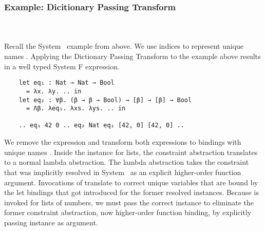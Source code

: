 \subsubsection{Example: Dicitionary Passing Transform}\hfill\\\\
Recall the System \Fo\ example from above. 
We use indices to represent unique names .
Applying the Dictionary Passing Transform to the example above results in a well typed System F expression.
\begin{verbatim}
    let eq₁ : Nat → Nat → Bool 
      = λx. λy. .. in
    let eq₂ : ∀β. (β → β → Bool) → [β] → [β] → Bool 
      = Λβ. λeq₁. λxs. λys. .. in
    
    .. eq₁ 42 0 .. eq₂ Nat eq₁ [42, 0] [42, 0] .. 
\end{verbatim}
We remove the \inl{|\Decl|}expression and transform both \inl{|\Inst|}expressions to  bindings with unique names . 
Inside the instance for lists, the constraint abstraction translates to a normal lambda abstraction. 
The lambda abstraction takes the constraint that was implicitly resolved in System \Fo\ as an explicit higher-order function argument.
Invocations of  translate to correct unique variables  that are bound by the let bindings that got introduced for the former resolved instances.
Because  is invoked for lists of numbers, we must pass the correct instance to eliminate the former constraint abstraction, now higher-order function binding, by explicitly passing instance  as argument.
